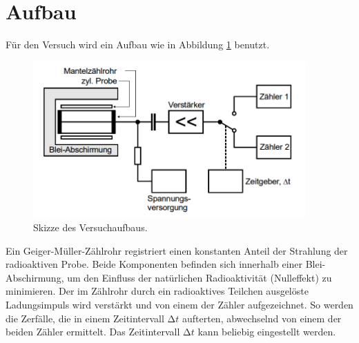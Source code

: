 \section{Aufbau}
\label{sec:Aufbau}

Für den Versuch wird ein Aufbau wie in Abbildung \ref{fig:aufbau} benutzt.
\begin{figure}
  \centering
  \includegraphics[height=6cm]{data/Aufbau.png}
  \caption{Skizze des Versuchaufbaus.}
  \label{fig:aufbau}
\end{figure}
Ein Geiger-Müller-Zählrohr registriert einen konstanten Anteil der Strahlung der radioaktiven Probe.
Beide Komponenten befinden sich innerhalb einer Blei-Abschirmung, um den Einfluss der natürlichen Radioaktivität (Nulleffekt) zu minimieren.
Der im Zählrohr durch ein radioaktives Teilchen ausgelöste Ladungsimpuls wird verstärkt und von einem der Zähler aufgezeichnet.
So werden die Zerfälle, die in einem Zeitintervall $\increment t$ aufterten, abwechselnd von einem der beiden Zähler ermittelt.
Das Zeitintervall $\increment t$ kann beliebig eingestellt werden.
